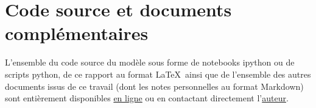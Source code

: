 
\chapter{Code source et documents complémentaires} %

\label{Code} %

L'ensemble du code source du modèle sous forme de notebooks ipython ou de scripts python, de ce rapport au format \LaTeX~ainsi que de l'ensemble des autres documents issus de ce travail (dont les notes personnelles au format Markdown) sont entièrement disponibles \href{https://github.com/pierrealbiges/ActiveVision}{en ligne} ou en contactant directement l'\href{pierre.albiges@etu.univ-amu.fr}{auteur}.